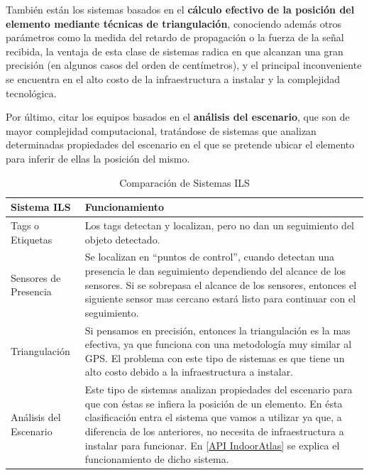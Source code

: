 También están los sistemas basados en el \textbf{cálculo efectivo de la posición del elemento mediante técnicas de triangulación}, conociendo además otros parámetros como la medida del retardo de propagación o la fuerza de la señal recibida, la ventaja de esta clase de sistemas radica en que alcanzan una gran precisión (en algunos casos del orden de centímetros), y el principal inconveniente se encuentra en el alto costo de la infraestructura a instalar y la complejidad tecnológica.

Por último, citar los equipos basados en el \textbf{análisis del escenario}, que son de mayor complejidad computacional, tratándose de sistemas que analizan determinadas propiedades del escenario en el que se pretende ubicar el elemento para inferir de ellas la posición del mismo. \cite{ILS}

\begin{table}[h!]
	\begin{center}
		\begin{tabular}{|p{3.8cm}|p{10.2cm}|}
			\hline \rowcolor[RGB]{51,153,255} 
			\textcolor{blanco}{\bf Sistema ILS} &
				\textcolor{blanco}{\bf Funcionamiento} \\
			\hline 
				Tags o Etiquetas &
				Los tags detectan y localizan, pero no dan un seguimiento del objeto detectado. \\
      		\hline \rowcolor[RGB]{240,248,255}
      			Sensores de Presencia &
				Se localizan en ``puntos de control'', cuando detectan una presencia le dan seguimiento dependiendo del alcance de los sensores. Si se sobrepasa el alcance de los sensores, entonces el siguiente sensor mas cercano estará listo para continuar con el seguimiento. \\
			\hline 
				Triangulación &
				Si pensamos en precisión, entonces la triangulación es la mas efectiva, ya que funciona con una metodología muy similar al GPS. El problema con este tipo de sistemas es que tiene un alto costo debido a la infraestructura a instalar. \\
			\hline \rowcolor[RGB]{240,248,255}
      			Análisis del Escenario &
				Este tipo de sistemas analizan propiedades del escenario para que con éstas se infiera la posición de un elemento. En ésta clasificación entra el sistema que vamos a utilizar ya que, a diferencia de los anteriores, no necesita de infraestructura a instalar para funcionar. En \hyperlink{APIIndoorAtlas}{[API IndoorAtlas]} se explica el funcionamiento de dicho sistema. \\ 
      		\hline 
    		\end{tabular}
	\end{center}
	\caption[Comparación de Sistemas ILS]{Comparación de Sistemas ILS} 
	\label{tab:comparacionILS}
\end{table}

